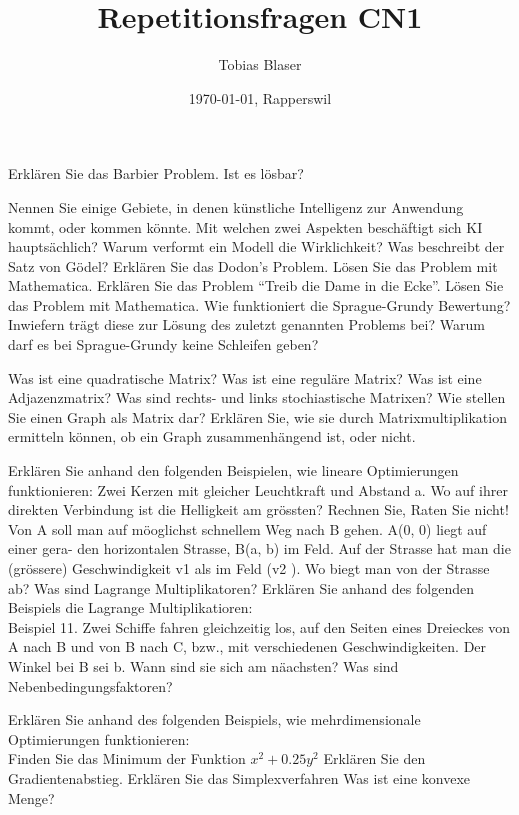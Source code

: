 \documentclass[ngerman,a4paper,12pt]{scrreprt}
\title{Repetitionsfragen CN1}
\author{Tobias Blaser}
\date{\today{}, Rapperswil}
\begin{document}
\tableofcontents
\clearpage

\ol
	\li Erklären Sie das Barbier Problem. Ist es lösbar?
\olS

\olR
	\li Nennen Sie einige Gebiete, in denen künstliche Intelligenz zur Anwendung kommt, oder kommen könnte.
	\li Mit welchen zwei Aspekten beschäftigt sich KI hauptsächlich?
	\li Warum verformt ein Modell die Wirklichkeit?
	\li Was beschreibt der Satz von Gödel?
	\li Erklären Sie das Dodon's Problem. Lösen Sie das Problem mit Mathematica.
	\li Erklären Sie das Problem ``Treib die Dame in die Ecke''. Lösen Sie das Problem mit Mathematica.
	\li Wie funktioniert die Sprague-Grundy Bewertung? Inwiefern trägt diese zur Lösung des zuletzt genannten Problems bei? Warum darf es bei Sprague-Grundy keine Schleifen geben?
\olS

\olR
	\li Was ist eine quadratische Matrix?
	\li Was ist eine reguläre Matrix?
	\li Was ist eine Adjazenzmatrix?
	\li Was sind rechts- und links stochiastische Matrixen?
	\li Wie stellen Sie einen Graph als Matrix dar?
	\li Erklären Sie, wie sie durch Matrixmultiplikation ermitteln können, ob ein Graph zusammenhängend ist, oder nicht.
\olS


\olR
	\li Erklären Sie anhand den folgenden Beispielen, wie lineare Optimierungen funktionieren:
		\ul
			\li Zwei Kerzen mit gleicher Leuchtkraft und Abstand a. Wo auf ihrer direkten Verbindung ist die Helligkeit am grössten? Rechnen Sie, Raten Sie nicht!
			\li Von A soll man auf möoglichst schnellem Weg nach B gehen. A(0, 0) liegt auf einer gera-
den horizontalen Strasse, B(a, b) im Feld. Auf der Strasse hat man die (grössere) Geschwindigkeit
v1 als im Feld (v2 ). Wo biegt man von der Strasse ab?
		\ulE
	\li Was sind Lagrange Multiplikatoren? Erklären Sie anhand des folgenden Beispiels die Lagrange Multiplikatioren: \\
		Beispiel 11. Zwei Schiffe fahren gleichzeitig los, auf den Seiten eines Dreieckes von A nach B und von B nach C, bzw., mit verschiedenen Geschwindigkeiten. Der Winkel bei B sei b. Wann sind
sie sich am näachsten?
	\li Was sind Nebenbedingungsfaktoren?
\olS

\olR
	\li Erklären Sie anhand des folgenden Beispiels, wie mehrdimensionale Optimierungen funktionieren: \\
		Finden Sie das Minimum der Funktion $x^2 + 0.25 y^2$
	\li Erklären Sie den Gradientenabstieg.
	\li Erklären Sie das Simplexverfahren
	\li Was ist eine konvexe Menge?
\olS
\end{document}
